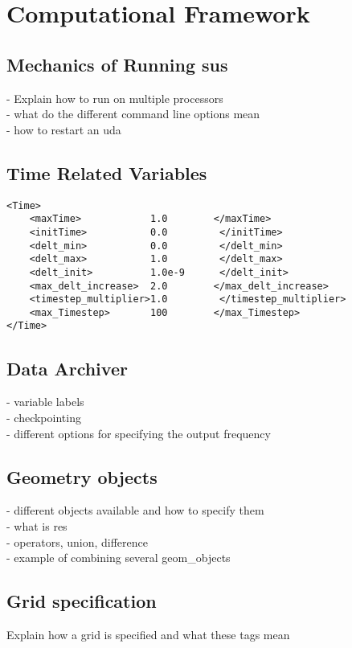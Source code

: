 \section{Computational Framework} \label{Sec:UCF}

\subsection{Mechanics of Running sus}
 - Explain how to run on multiple processors\\
 - what do the different command line options mean\\
 - how to restart an uda\\
 
\subsection{Time Related Variables}
\begin{Verbatim}[fontsize=\footnotesize]
<Time>
    <maxTime>            1.0        </maxTime>
    <initTime>           0.0         </initTime>
    <delt_min>           0.0         </delt_min>
    <delt_max>           1.0         </delt_max>
    <delt_init>          1.0e-9      </delt_init>
    <max_delt_increase>  2.0        </max_delt_increase>
    <timestep_multiplier>1.0         </timestep_multiplier>
    <max_Timestep>       100        </max_Timestep>
</Time>
\end{Verbatim}
%
\subsection{Data Archiver}
- variable labels\\
- checkpointing \\
- different options for specifying the output frequency\\
%
\subsection{Geometry objects}
- different objects available and how to specify them\\
- what is res \\
- operators, union, difference\\
- example of combining several geom\_objects\\
%
\subsection{Grid specification}
Explain how a grid is specified and what these tags mean

